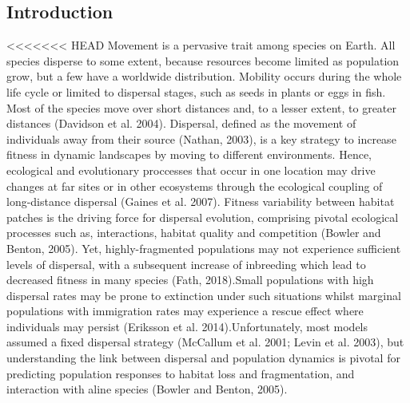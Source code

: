 \documentclass[12pt]{article}
\begin{document}
\begin{flushleft}
\section{Introduction}
<<<<<<< HEAD
Movement is a pervasive trait among species on Earth. All species
disperse to some extent, because resources become limited as
population grow, but a few have a worldwide distribution. Mobility
occurs during the whole life cycle or limited to dispersal stages,
such as seeds in plants or eggs in fish. Most of the species move over
short distances and, to a lesser extent, to greater distances
(Davidson et al. 2004). Dispersal, defined as the movement of
individuals away from their source (Nathan, 2003), is a key strategy
to increase fitness in dynamic landscapes by moving to different
environments. Hence, ecological and evolutionary proccesses that occur
in one location may drive changes at far sites or in other ecosystems
through the ecological coupling of long-distance dispersal (Gaines et
al. 2007). Fitness variability between habitat patches is the driving
force for dispersal evolution, comprising pivotal ecological processes
such as, interactions, habitat quality and competition (Bowler and
Benton, 2005). Yet, highly-fragmented populations may not experience
sufficient levels of dispersal, with a subsequent increase of
inbreeding which lead to decreased fitness in many species (Fath,
2018).Small populations with high dispersal rates may be prone to
extinction under such situations whilst marginal populations with
immigration rates may experience a rescue effect where individuals may
persist (Eriksson et al. 2014).Unfortunately, most models assumed a
fixed dispersal strategy (McCallum et al. 2001; Levin et al. 2003),
but understanding the link between dispersal and population dynamics
is pivotal for predicting population responses to habitat loss and
fragmentation, and interaction with aline species (Bowler and Benton,
2005).


\end{flushleft}
\end{document}
